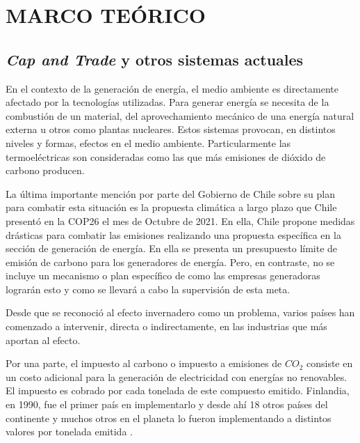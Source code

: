 
\chapter{MARCO TEÓRICO}
\label{c2} 


\section{\textit{Cap and Trade} y otros sistemas actuales}\label{c22}

En el contexto de la generación de energía, el medio ambiente es directamente afectado por la tecnologías utilizadas. Para generar energía se necesita de la combustión de un material, del aprovechamiento mecánico de una energía natural externa u otros como plantas nucleares. Estos sistemas provocan, en distintos niveles y formas, efectos en el medio ambiente. Particularmente las termoeléctricas son consideradas como las que más emisiones de dióxido de carbono producen.
\vspace{2.5mm}

La última importante mención por parte del Gobierno de Chile sobre su plan para combatir esta situación es la propuesta climática a largo plazo  que Chile presentó en la COP26 el mes de Octubre de 2021. En ella, Chile propone medidas drásticas para combatir las emisiones realizando una propuesta específica en la sección de generación de energía. En ella se presenta un presupuesto límite de emisión de carbono para los generadores de energía. Pero, en contraste, no se incluye un mecanismo o plan específico de como las empresas generadoras lograrán esto y como se llevará a cabo la supervisión de esta meta.
\vspace{2.5mm}

Desde que se reconoció al efecto invernadero como un problema, varios países han comenzado a intervenir, directa o indirectamente, en las industrias que más aportan al efecto. 
\vspace{2.5mm}

Por una parte, el impuesto al carbono o impuesto a emisiones de $CO_2$ consiste en un costo adicional para la generación de electricidad con energías no renovables. El impuesto es cobrado por cada tonelada de este compuesto emitido. Finlandia, en 1990, fue el primer país en implementarlo y desde ahí 18 otros países del continente y muchos otros en el planeta lo fueron implementando a distintos valores por tonelada emitida .
\vspace{2.5mm}

